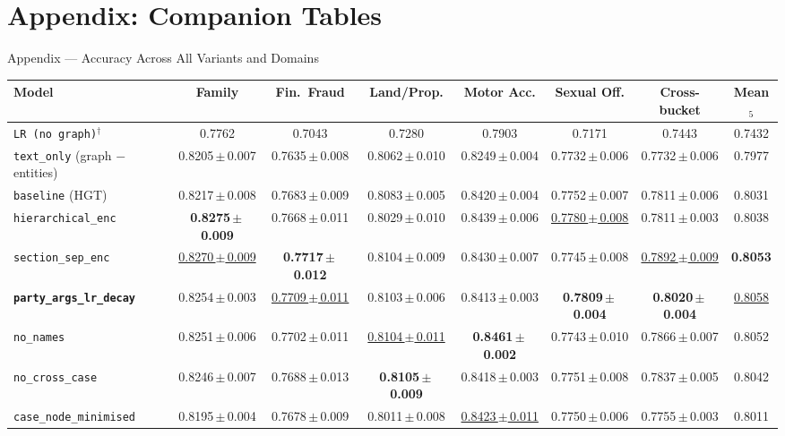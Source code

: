 \documentclass[aspectratio=169,11pt]{beamer}
\begin{document}
\section{Appendix: Companion Tables}

\begin{frame}{Appendix --- Accuracy Across All Variants and Domains}
  \tiny
  \centering
  \setlength{\tabcolsep}{3pt}
  \begin{adjustbox}{max width=\textwidth}
    \begin{tabular}{lccccccc}
      \toprule
      \textbf{Model} & \textbf{Family} & \textbf{Fin.\ Fraud} & \textbf{Land/Prop.} & \textbf{Motor Acc.} & \textbf{Sexual Off.} & \textbf{Cross-bucket} & \textbf{Mean$_5$} \\
      \midrule
      \texttt{LR (no graph)}$^\dagger$          & 0.7762               & 0.7043               & 0.7280               & 0.7903               & 0.7171               & 0.7443               & 0.7432 \\
      \texttt{text\_only} (graph $-$ entities)  & 0.8205\,$\pm$\,0.007 & 0.7635\,$\pm$\,0.008 & 0.8062\,$\pm$\,0.010 & 0.8249\,$\pm$\,0.004 & 0.7732\,$\pm$\,0.006 & 0.7732\,$\pm$\,0.006 & 0.7977 \\
      \texttt{baseline} (HGT)                   & 0.8217\,$\pm$\,0.008 & 0.7683\,$\pm$\,0.009 & 0.8083\,$\pm$\,0.005 & 0.8420\,$\pm$\,0.004 & 0.7752\,$\pm$\,0.007 & 0.7811\,$\pm$\,0.006 & 0.8031 \\
      \texttt{hierarchical\_enc}                & \textbf{0.8275\,$\pm$\,0.009} & 0.7668\,$\pm$\,0.011 & 0.8029\,$\pm$\,0.010 & 0.8439\,$\pm$\,0.006 & \underline{0.7780\,$\pm$\,0.008} & 0.7811\,$\pm$\,0.003 & 0.8038 \\
      \texttt{section\_sep\_enc}                & \underline{0.8270\,$\pm$\,0.009} & \textbf{0.7717\,$\pm$\,0.012} & 0.8104\,$\pm$\,0.009 & 0.8430\,$\pm$\,0.007 & 0.7745\,$\pm$\,0.008 & \underline{0.7892\,$\pm$\,0.009} & \textbf{0.8053} \\
      \textbf{\texttt{party\_args\_lr\_decay}}  & 0.8254\,$\pm$\,0.003 & \underline{0.7709\,$\pm$\,0.011} & 0.8103\,$\pm$\,0.006 & 0.8413\,$\pm$\,0.003 & \textbf{0.7809\,$\pm$\,0.004} & \textbf{0.8020\,$\pm$\,0.004} & \underline{0.8058} \\
      \texttt{no\_names}                        & 0.8251\,$\pm$\,0.006 & 0.7702\,$\pm$\,0.011 & \underline{0.8104\,$\pm$\,0.011} & \textbf{0.8461\,$\pm$\,0.002} & 0.7743\,$\pm$\,0.010 & 0.7866\,$\pm$\,0.007 & 0.8052 \\
      \texttt{no\_cross\_case}                  & 0.8246\,$\pm$\,0.007 & 0.7688\,$\pm$\,0.013 & \textbf{0.8105\,$\pm$\,0.009} & 0.8418\,$\pm$\,0.003 & 0.7751\,$\pm$\,0.008 & 0.7837\,$\pm$\,0.005 & 0.8042 \\
      \texttt{case\_node\_minimised}            & 0.8195\,$\pm$\,0.004 & 0.7678\,$\pm$\,0.009 & 0.8011\,$\pm$\,0.008 & \underline{0.8423\,$\pm$\,0.011} & 0.7750\,$\pm$\,0.006 & 0.7755\,$\pm$\,0.003 & 0.8011 \\
      \bottomrule
    \end{tabular}
  \end{adjustbox}


\end{frame}
\end{document}
